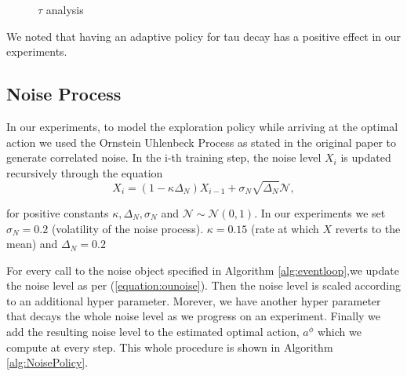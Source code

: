 \begin{figure}[!tbp]
  \vfill
  
  \caption{ $\tau$ analysis}
  \label{fig:results:tau}
\end{figure}
 We noted that having an adaptive policy for tau decay has a positive effect in our experiments.
 \pagebreak
\subsection{Noise Process}

In our experiments, to model the exploration policy while arriving at the optimal action we used the Ornstein Uhlenbeck Process \cite{uhlenbeck1930} as stated in the original paper to generate correlated noise.
In the i-th training step, the noise level $X_i$ is updated recursively through the equation
\begin{equation}\label{equation:ounoise}
    X_i= (1-\kappa\Delta_N) X_{i-1}
    + \sigma_N \sqrt{\Delta_N}\mathcal{N},
\end{equation}

for positive constants $\kappa,\Delta_N,\sigma_N$  and $\mathcal{N} \sim \mathcal{N}(0,1)$.
In our experiments we set $\sigma_N = 0.2$ (volatility of the noise process). $\kappa = 0.15$ (rate at which $X$ reverts to the mean) and $\Delta_N=0.2$

For every call to the noise object specified in Algorithm \ref{alg:eventloop},we update the noise level as per (\ref{equation:ounoise}). Then the noise level is scaled according to an additional hyper parameter. Morever, we have another hyper parameter that decays the whole noise level as we progress on an experiment. Finally we add the resulting noise level to the estimated optimal action, $a^{\phi}$ which we compute at every step. This whole procedure is shown in Algorithm \ref{alg:NoisePolicy}.

